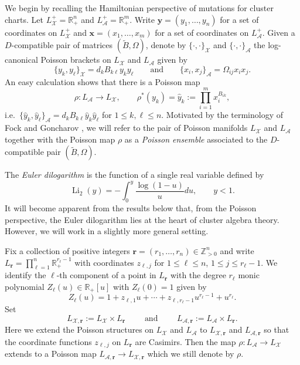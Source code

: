 \documentclass{amsart}
\numberwithin{equation}{section}
\newcommand{\bfr}{{\boldsymbol{r}}}
\newcommand{\bfx}{{\boldsymbol{x}}}
\newcommand{\bfy}{{\boldsymbol{y}}}
\newcommand{\cA}{\mathcal{A}}
\newcommand{\cX}{\mathcal{X}}
\newcommand{\RR}{\mathbb{R}}
\newcommand{\ZZ}{\mathbb{Z}}
\newcommand{\Li}{\operatorname{Li}}
\begin{document}
We begin by recalling the Hamiltonian perspective of mutations for cluster charts.
Let $L^+_\cX=\RR_+^n$ and $L^+_\cA=\RR_+^m$.
Write $\bfy=(y_1,\ldots,y_n)$ for a set of coordinates on $L^+_\cX$ and $\bfx=(x_1,\ldots,x_m)$ for a set of coordinates on $L^+_\cA$.
Given a $D$-compatible pair of matrices $(\tilde B,\Omega)$, denote by $\{\cdot,\cdot\}_\cX$ and $\{\cdot,\cdot\}_\cA$ the log-canonical Poisson brackets on $L_\cX$ and $L_\cA$ given by
\begin{equation}
  \label{eq:brackets}
  \{y_k,y_\ell\}_\cX=d_kB_{k\ell}y_ky_\ell\qquad\text{and}\qquad\{x_i,x_j\}_\cA=\Omega_{ij}x_ix_j.
\end{equation}
An easy calculation shows that there is a Poisson map
\begin{equation}\label{eq:ensemble}
	\rho:L_\cA\to L_\cX,\qquad \rho^*(y_k)=\hat y_k:=\prod_{i=1}^m x_i^{B_{ik}},
\end{equation}
i.e.\ $\{\hat y_k,\hat y_\ell\}_\cA=d_kB_{k\ell}\hat y_k\hat y_\ell$ for $1\le k,\ell\le n$.
Motivated by the terminology of Fock and Goncharov \cite{FG09a}, we will refer to the pair of Poisson manifolds $L_\cX$ and $L_\cA$ together with the Poisson map $\rho$ as a \emph{Poisson ensemble} associated to the $D$-compatible pair $(\tilde B,\Omega)$.

The \emph{Euler dilogarithm} is the function of a single real variable defined by
\[\Li_2(y)=-\int_0^y \frac{\log(1-u)}{u}du,\qquad y<1.\]
It will become apparent from the results below that, from the Poisson perspective, the Euler dilogarithm lies at the heart of cluster algebra theory.
However, we will work in a slightly more general setting.

Fix a collection of positive integers $\bfr=(r_1,\ldots,r_n)\in\ZZ_{>0}^n$ and write $L_\bfr=\prod_{\ell=1}^n \RR_+^{r_\ell-1}$ with coordinates $z_{\ell,j}$ for $1\le\ell\le n$, $1\le j\le r_\ell-1$.
We identify the $\ell$-th component of a point in $L_\bfr$ with the degree $r_\ell$ monic polynomial $Z_\ell(u)\in\RR_+[u]$ with $Z_\ell(0)=1$ given by
\[Z_\ell(u)=1+z_{\ell,1}u+\cdots+z_{\ell,r_\ell-1}u^{r_\ell-1}+u^{r_\ell}.\]
Set 
\[L_{\cX,\bfr}:=L_\cX\times L_\bfr\qquad\text{ and }\qquad L_{\cA,\bfr}:=L_\cA\times L_\bfr.\]
Here we extend the Poisson structures on $L_\cX$ and $L_\cA$ to $L_{\cX,\bfr}$ and $L_{\cA,\bfr}$ so that the coordinate functions $z_{\ell,j}$ on $L_\bfr$ are Casimirs. 
Then the map $\rho:L_\cA\to L_\cX$ extends to a Poisson map $L_{\cA,\bfr}\to L_{\cX,\bfr}$ which we still denote by $\rho$.
\end{document}
